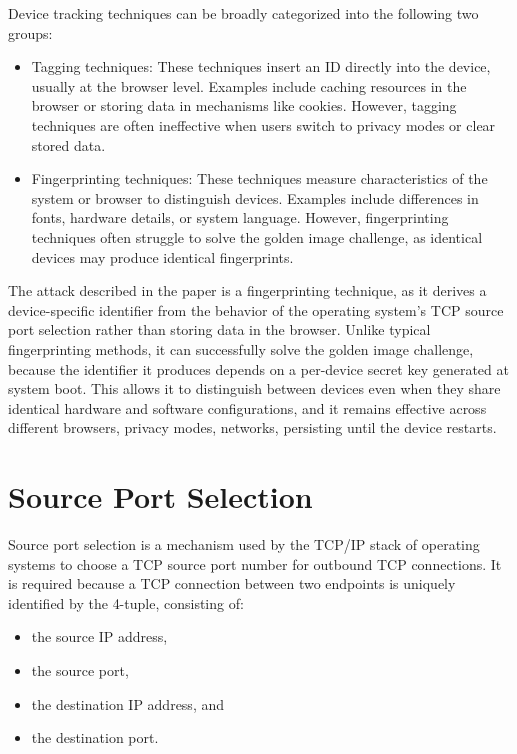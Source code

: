 \documentclass{report}
\begin{document}
Device tracking techniques can be broadly categorized into the following two groups:

\begin{itemize}
    \item \alert{Tagging techniques:} These techniques insert an ID directly into the device, usually at the browser level. Examples include caching resources in the browser or storing data in mechanisms like cookies. However, tagging techniques are often ineffective when users switch to privacy modes or clear stored data.
    
    \item \alert{Fingerprinting techniques:} These techniques measure characteristics of the system or browser to distinguish devices. Examples include differences in fonts, hardware details, or system language. However, fingerprinting techniques often struggle to solve the golden image challenge, as identical devices may produce identical fingerprints.
\end{itemize}

The attack described in the paper is a \alert{fingerprinting technique}, as it derives a device-specific identifier from the behavior of the operating system’s TCP source port selection rather than storing data in the browser. Unlike typical fingerprinting methods, it can successfully solve the \alert{golden image challenge}, because the identifier it produces depends on a per-device secret key generated at system boot. This allows it to distinguish between devices even when they share identical hardware and software configurations, and it remains effective across different browsers, privacy modes, networks, persisting until the device restarts.

\section{Source Port Selection}
\label{sec:source port selection}

Source port selection is a mechanism used by the TCP/IP stack of operating systems to choose a TCP source port number for outbound TCP connections. It is required because a TCP connection between two endpoints is uniquely identified by the \alert{4-tuple}, consisting of:
\begin{itemize}
    \item the \alert{source IP} address,
    \item the \alert{source port},
    \item the \alert{destination IP} address, and
    \item the \alert{destination port}.
\end{itemize}
\end{document}
